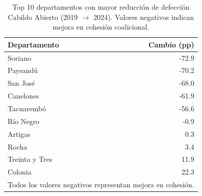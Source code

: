 \begin{table}[H]
\centering
\caption{Top 10 departamentos con mayor reducción de defección Cabildo Abierto (2019 $\to$ 2024). Valores negativos indican mejora en cohesión coalicional.}
\label{tab:dept_changes_ca_top10}
\begin{tabular}{lr}
\toprule
\textbf{Departamento} & \textbf{Cambio (pp)} \\
\midrule
Soriano & -72.9 \\
Paysandú & -70.2 \\
San José & -68.0 \\
Canelones & -61.9 \\
Tacuarembó & -56.6 \\
Río Negro & -0.9 \\
Artigas & 0.3 \\
Rocha & 3.4 \\
Treinta y Tres & 11.9 \\
Colonia & 22.3 \\
\bottomrule
\multicolumn{2}{l}{\footnotesize Todos los valores negativos representan mejora en cohesión.} \\
\end{tabular}
\end{table}
